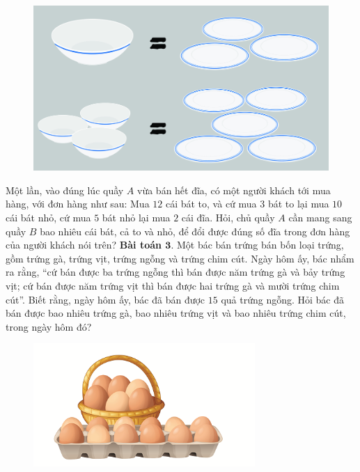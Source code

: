 	\begin{figure}
		\centering
		\vspace*{-5pt}
		\captionsetup{labelformat= empty, justification=centering}
		\includegraphics[width=1\linewidth]{pic4}
		\vspace*{-10pt}
	\end{figure}
	Một lần, vào đúng lúc quầy $A$ vừa bán hết đĩa, có một người khách tới mua hàng, với đơn hàng như sau: Mua $12$ cái bát to, và cứ mua $3$ bát to lại mua $10$ cái bát nhỏ, cứ mua $5$ bát nhỏ lại mua $2$ cái đĩa.
	\vskip 0.15cm
	Hỏi, chủ quầy $A$ cần mang sang quầy $B$ bao nhiêu cái bát, cả to và nhỏ, để đổi được đúng số đĩa trong đơn hàng của người khách nói trên?
	\vskip 0.1cm
	\textbf{\color{toancuabi}Bài toán $\pmb{3.}$} Một bác bán trứng bán bốn loại trứng, gồm trứng gà, trứng vịt, trứng ngỗng và trứng chim cút. Ngày hôm ấy, bác nhẩm ra rằng, “cứ bán được ba trứng ngỗng thì bán được năm trứng gà và bảy trứng vịt; cứ bán được năm trứng vịt thì bán được hai trứng gà và mười trứng chim cút”. Biết rằng, ngày hôm ấy, bác đã bán được $15$ quả trứng ngỗng. Hỏi bác đã bán được bao nhiêu trứng gà, bao nhiêu trứng vịt và bao nhiêu trứng chim cút, trong ngày hôm đó?
	\begin{figure}[H]
		\centering
		\vspace*{-5pt}
		\captionsetup{labelformat= empty, justification=centering}
		\includegraphics[width=0.75\textwidth]{pic6}
		\vspace*{-5pt}
	\end{figure}
